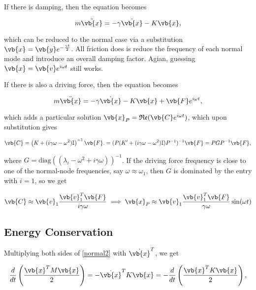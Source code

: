 \documentclass[a4paper,12pt]{report}
\begin{document}
If there is damping, then the equation becomes 

\begin{equation}
    m \ddot{\vb{x} } = -\gamma \dot{\vb{x} }-K\vb{x},  
\end{equation}

which can be reduced to the normal case via a substitution \(\vb{x} = \vb{y} e^{-\frac{\gamma t}{2} } \). All friction does is reduce the frequency of each normal mode and introduce an overall damping factor. Agian, guessing \(\vb{x} = \vb{v} e^{i \omega t} \) still works. 

If there is also a driving force, then the equation becomes

\begin{equation}
    m \ddot{\vb{x} } = -\gamma \dot{\vb{x} } - K\vb{x} + \vb{F} e^{i \omega t} ,  
\end{equation}

which adds a particular solution \(\vb{x}_{P}  = \mathfrak{Re} (\vb{C} e^{i \omega t} ) \), which upon substitution gives 

\begin{equation}
    \vb{C} = \left( K+(i \gamma \omega -\omega ^2)\mathbb{I} \right)^{-1} \vb{F}. = (P(K' + (i \gamma \omega - \omega ^2)\mathbb{I})P^{-1} )^{-1} \vb{F} = PGP^{-1} \vb{F} ,
\end{equation}

where \(G = \text{diag}((\lambda _{i} - \omega ^2+i \gamma \omega  ))^{-1}  \). If the driving force frequency is close to one of the normal-node frequencies, say \(\omega \approx \omega _{1} \), then \(G\) is dominated by the entry with \(i = 1\), so we get 

\begin{equation}
    \vb{C} \approx \vb{v} _{1} \frac{\vb{v} _{1} ^T \vb{F} }{i \gamma \omega }  \implies \vb{x} _{P} \approx \vb{v} _{1} \frac{\vb{v} _{1} ^T \vb{F}  }{\gamma \omega }\sin (\omega t)
\end{equation}


\subsection{Energy Conservation}

Multiplying both sides of \cref{normal2} with \(\dot{\vb{x} }^T \), we get

\begin{equation}
    \frac{d}{dt} \left(\frac{\vb{x} ^TM\vb{x} }{2}\right) = - \dot{\vb{x} }^TK\vb{x} = -\frac{d}{dt} \left( \frac{\vb{x}^T K \vb{x} }{2}  \right),  
\end{equation}
\end{document}
